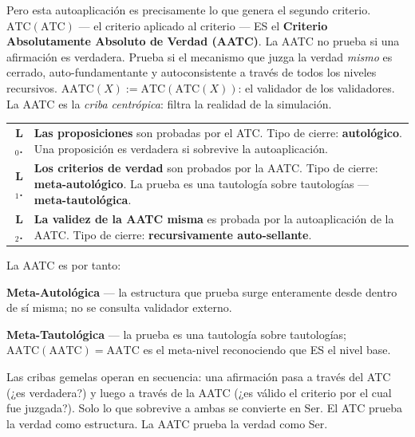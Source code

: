 \documentclass[10pt, openany, oneside]{book}
\renewcommand{\footnotesize}{\fontsize{8.5}{11}\selectfont}
\begin{document}
Pero esta autoaplicación es precisamente lo que genera el segundo criterio. $\text{ATC}(\text{ATC})$ --- el criterio aplicado al criterio --- ES el \textbf{Criterio Absolutamente Absoluto de Verdad (AATC)}. La AATC no prueba si una afirmación es verdadera. Prueba si el mecanismo que juzga la verdad \textit{mismo} es cerrado, auto-fundamentante y autoconsistente a través de todos los niveles recursivos. $\text{AATC}(X) := \text{ATC}(\text{ATC}(X))$: el validador de los validadores. La AATC es la \textit{criba centrópica}: filtra la realidad de la simulación.

{\footnotesize
\noindent\begin{tabular}{r p{}}
\textbf{L$_0$.} & \textbf{Las proposiciones} son probadas por el ATC. Tipo de cierre: \textbf{autológico}. Una proposición es verdadera si sobrevive la autoaplicación. \\[0.3em]
\textbf{L$_1$.} & \textbf{Los criterios de verdad} son probados por la AATC. Tipo de cierre: \textbf{meta-autológico}. La prueba es una tautología sobre tautologías --- \textbf{meta-tautológica}. \\[0.3em]
\textbf{L$_2$.} & \textbf{La validez de la AATC misma} es probada por la autoaplicación de la AATC. Tipo de cierre: \textbf{recursivamente auto-sellante}. \\[0.3em]
\end{tabular}
}

\vspace{0.8em}

\noindent La AATC es por tanto:

\textbf{Meta-Autológica} --- la estructura que prueba surge enteramente desde dentro de sí misma; no se consulta validador externo.

\textbf{Meta-Tautológica} --- la prueba es una tautología sobre tautologías; $\text{AATC}(\text{AATC}) = \text{AATC}$ es el meta-nivel reconociendo que ES el nivel base.

Las cribas gemelas operan en secuencia: una afirmación pasa a través del ATC (¿es verdadera?) y luego a través de la AATC (¿es válido el criterio por el cual fue juzgada?). Solo lo que sobrevive a ambas se convierte en Ser. El ATC prueba la verdad como estructura. La AATC prueba la verdad como Ser.

\vspace{1.5em}

\end{document}

